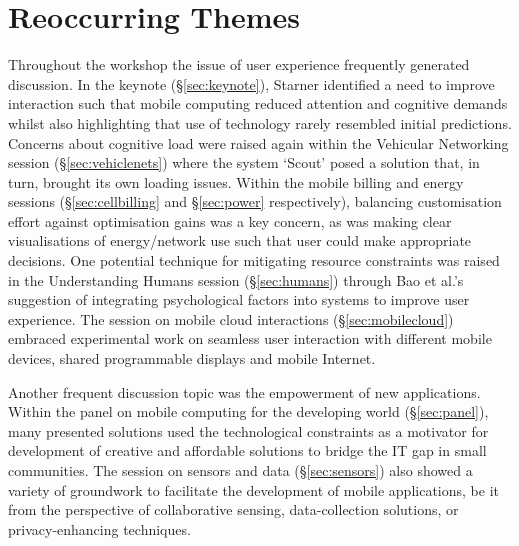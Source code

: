 \section{Reoccurring Themes}
\label{sec:keythemes}

Throughout the workshop the issue of user experience frequently generated 
discussion. In the keynote (\S\ref{sec:keynote}), Starner identified a need 
to improve interaction such that mobile computing reduced attention and cognitive 
demands whilst also highlighting that use of technology rarely resembled initial 
predictions. Concerns about cognitive load were raised again within the Vehicular 
Networking session (\S\ref{sec:vehiclenets}) where the system `Scout' posed 
a solution that, in turn, brought its own loading issues. Within the mobile 
billing and energy sessions (\S\ref{sec:cellbilling} and \S\ref{sec:power} 
respectively), balancing customisation effort against optimisation gains was a 
key concern, as was making clear visualisations of energy\slash network use such 
that user could make appropriate decisions. One potential technique for 
mitigating resource constraints was raised in the Understanding Humans session 
(\S\ref{sec:humans}) through Bao et al.'s suggestion of integrating
psychological factors into systems to improve user experience. The
session on mobile cloud interactions (\S\ref{sec:mobilecloud}) embraced
experimental work on seamless user interaction with different mobile
devices, shared programmable displays and mobile Internet.

Another frequent discussion topic was the empowerment of new
applications. Within the panel on mobile computing for the developing
world (\S\ref{sec:panel}), many presented solutions used the
technological constraints as a motivator for development of creative and
affordable solutions to bridge the IT gap in small communities. The
session on sensors and data (\S\ref{sec:sensors}) also showed a variety
of groundwork to facilitate the development of mobile applications,
be it from the perspective of collaborative sensing, data-collection
solutions, or privacy-enhancing techniques.

